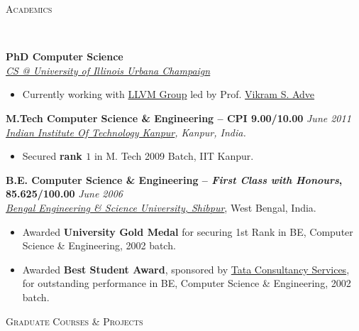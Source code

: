 \documentclass[9pt]{article}
\newenvironment{changemargin}[2]{%
  \begin{list}{}{%
    \setlength{\topsep}{0pt}%
    \setlength{\leftmargin}{#1}%
    \setlength{\rightmargin}{#2}%
    \setlength{\listparindent}{\parindent}%
    \setlength{\itemindent}{\parindent}%
    \setlength{\parsep}{\parskip}%
  }%
  \item[]}{\end{list}
}
\newcommand{\lineover}{
	\begin{changemargin}{-0.05in}{-0.05in}
		\vspace*{-8pt}
		\hrulefill \\
		\vspace*{-2pt}
	\end{changemargin}
}
\newcommand{\header}[1]{
	\begin{changemargin}{-0.5in}{-0.5in}
		\scshape{#1}\\
  	\lineover
	\end{changemargin}
}
\newenvironment{body} {
	\vspace*{-16pt}
	\begin{changemargin}{-0.25in}{-0.5in}
  }	
	{\end{changemargin}
}
\begin{document}
\smallskip


\header{Academics}

\begin{body}
	\vspace{14pt}
	\textbf{PhD Computer Science }{} \hfill \\
	\emph{\href{http://cs.illinois.edu/}{CS @ University of Illinois Urbana Champaign}}{} \\
	\begin{itemize} \itemsep -0pt
		\item Currently working with \href{http://llvm.org/}{ LLVM Group} led by Prof. \href{http://llvm.cs.uiuc.edu/~vadve/Home.html}{Vikram S. Adve}
	\end{itemize}
 \medskip
	\textbf{M.Tech Computer Science \& Engineering -- CPI 9.00/10.00}{} \hfill \emph{June 2011}{} \\
	\emph{\href{http://www.iitk.ac.in/}{Indian Institute Of Technology Kanpur}, Kanpur, India.}{} \\
	\begin{itemize} \itemsep -0pt
		\item Secured \textbf{rank $1$} in M. Tech 2009 Batch, IIT Kanpur.
	\end{itemize}
  \medskip
	\textbf{B.E. Computer Science \& Engineering -- \emph{First Class with Honours}, 85.625/100.00} \hfill \emph{June 2006} \\
	\emph{\href{http://www.becs.ac.in/}{Bengal Engineering \& Science University, Shibpur}}, West Bengal, India.\\
	\begin{itemize} \itemsep -0pt
		\item Awarded \textbf{University Gold Medal} for securing 1st Rank in BE, Computer Science \& Engineering, 2002 batch.
		\item Awarded \textbf{Best Student Award}, sponsored by \href{http://www.tcs.com}{Tata Consultancy Services}, for outstanding performance in BE, Computer Science \& Engineering, 2002 batch.
	\end{itemize}
\end{body}

\smallskip

\header{Graduate Courses \& Projects}
\end{document}
